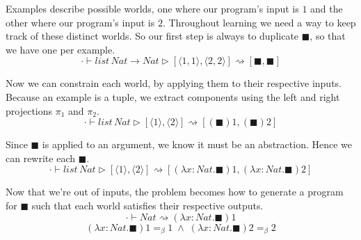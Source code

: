 \documentclass[sigplan,10pt]{acmart}
\newcommand{\lam}{\lambda}
\theoremstyle{mytheoremstyle}
\begin{document}
Examples describe possible worlds, one where our program's input is $1$ and the other where our program's input is $2$. Throughout learning we need a way to keep track of these distinct worlds. So our first step is always to duplicate $\blacksquare$, so that we have one per example. 
$$\cdot \vdash list \,Nat \!\to\! Nat \rhd [\langle1,1\rangle,\langle2,2\rangle] \rightsquigarrow [\blacksquare, \blacksquare]$$

Now we can constrain each world, by applying them to their respective inputs. Because an example is a tuple, we extract components using the left and right projections $\pi_1$ and $\pi_2$.
$$\cdot \vdash list \,Nat \rhd [\langle1\rangle,\langle2\rangle] \rightsquigarrow [(\blacksquare)1, (\blacksquare)2]$$

Since $\blacksquare$ is applied to an argument, we know it must be an abstraction. Hence we can rewrite each $\blacksquare$.
$$\cdot \vdash list \,Nat \rhd [\langle1\rangle,\langle2\rangle] \rightsquigarrow [(\lam x{:}Nat.\blacksquare)1, (\lam x{:}Nat.\blacksquare)2]$$

Now that we're out of inputs, the problem becomes how to generate a program for $\blacksquare$ such that each world satisfies their respective outputs. 
$$\cdot \vdash Nat \rightsquigarrow (\lam x{:}Nat.\blacksquare)1$$
$$(\lam x{:}Nat.\blacksquare)1 =_\beta 1\;\land\;(\lam x{:}Nat.\blacksquare)2=_\beta2$$
\end{document}
